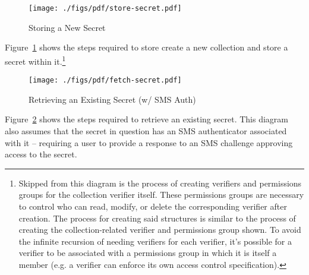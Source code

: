 \begin{figure}[th]
  \centering
  \texttt{[image: ./figs/pdf/store-secret.pdf]}
  \caption{Storing a New Secret}
  \label{fig:tutamen:storesecret}
\end{figure}

Figure~\ref{fig:tutamen:storesecret} shows the steps required to store
create a new collection and store a secret within it.\footnote{Skipped
  from this diagram is the process of creating verifiers and
  permissions groups for the collection verifier itself. These
  permissions groups are necessary to control who can read, modify, or
  delete the corresponding verifier after creation. The process for
  creating said structures is similar to the process of creating the
  collection-related verifier and permissions group shown. To avoid
  the infinite recursion of needing verifiers for each verifier, it's
  possible for a verifier to be associated with a permissions group in
  which it is itself a member (e.g. a verifier can enforce its own
  access control specification).}

\begin{figure}[th]
  \centering
  \texttt{[image: ./figs/pdf/fetch-secret.pdf]}
  \caption{Retrieving an Existing Secret (w/ SMS Auth)}
  \label{fig:tutamen:fetchsecret}
\end{figure}

Figure~\ref{fig:tutamen:fetchsecret} shows the steps required to
retrieve an existing secret. This diagram also assumes that the secret
in question has an SMS authenticator associated with it -- requiring a
user to provide a response to an SMS challenge approving access to the
secret.

